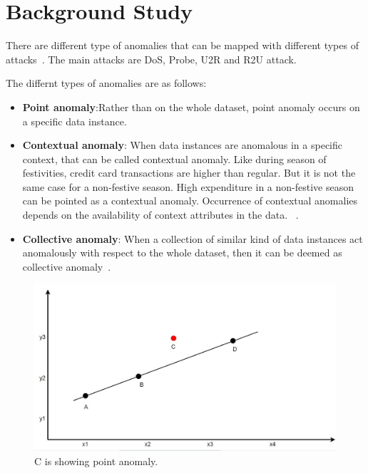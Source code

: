 \section{Background Study}
 There are different type of anomalies that can be mapped with different types of attacks~\cite{ahmed2016survey}. The main attacks are DoS, Probe, U2R and R2U attack.

The differnt types of anomalies are as follows:
\begin{itemize}
    \item \textbf{Point anomaly}:Rather than on the whole dataset, point anomaly occurs on a specific data instance.
    \item \textbf{Contextual anomaly}: When data instances are anomalous in a specific context, that can be called contextual anomaly. Like during season of festivities, credit card transactions are higher than regular. But it is not the same case for a non-festive season. High expenditure in a non-festive season can be pointed as a contextual anomaly. Occurrence of contextual anomalies depends on the availability of context attributes in the data. ~\cite{chandola2009anomaly}.
    \item \textbf{Collective anomaly}: When a collection of similar kind of data instances act anomalously with respect to the whole dataset, then it can be deemed as collective anomaly~\cite{ahmed2016survey}.
    
\end{itemize}

\begin{figure}[tb]
  \includegraphics[width=\linewidth]{point.JPG}
  \caption{C is showing point anomaly.}
  \label{fig:point}
\end{figure}

